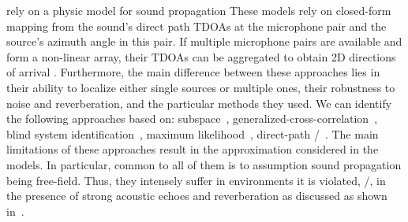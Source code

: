  rely on a physic model for sound propagation 
These models rely on closed-form mapping from the sound's direct path \acl{TDOAs} at the microphone pair and the source's azimuth angle in this pair.
If multiple microphone pairs are available and form a non-linear array, their TDOAs can be aggregated to obtain 2D directions of arrival .
Furthermore, the main difference between these approaches lies in their ability to localize either single sources or multiple ones, their robustness to noise and reverberation, and the particular methods they used.
We can identify the following approaches based on:
subspace~,
generalized-cross-correlation~,
blind system identification~,
maximum likelihood~,
direct-path \ReTF/~.
The main limitations of these approaches result in the approximation considered in the models.
In particular, common to all of them is to assumption sound propagation being free-field.
Thus, they intensely suffer in environments it is violated, \eg/, in the presence of strong acoustic echoes and reverberation as discussed as shown in~.

